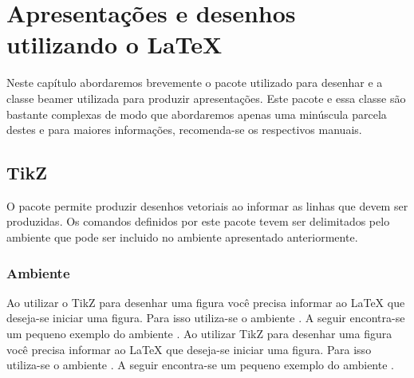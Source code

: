 % 
% 
% 
% 
% 
% 
%
%
\chapter{Apresenta\c{c}\~{o}es e desenhos utilizando o \LaTeX}
Neste cap\'{i}tulo abordaremos brevemente o pacote \nocite{Tantau:2010:Tikz-and-PGF} utilizado para desenhar e a classe beamer\nocite{Tantau:2010:Beamer} utilizada para produzir apresenta\c{c}\~{o}es. Este pacote e essa classe s\~{a}o bastante complexas de modo que abordaremos apenas uma min\'{u}scula parcela destes e para maiores informa\c{c}\~{o}es, recomenda-se os respectivos manuais.

\section{TikZ} \label{sse:tikz}
O pacote  permite produzir desenhos vetoriais ao informar as linhas que devem ser produzidas. Os comandos definidos por este pacote tevem ser delimitados pelo ambiente  que pode ser incluido no ambiente  apresentado anteriormente.

\subsection{Ambiente }
Ao utilizar o TikZ para desenhar uma figura voc\^{e} precisa informar ao LaTeX que deseja-se iniciar uma figura. Para isso utiliza-se o ambiente . A seguir encontra-se um pequeno exemplo do ambiente . 
Ao utilizar TikZ para desenhar uma figura voc\^{e} precisa informar ao LaTeX que deseja-se iniciar uma figura. Para isso utiliza-se o ambiente . A seguir encontra-se um pequeno exemplo do ambiente . \\

